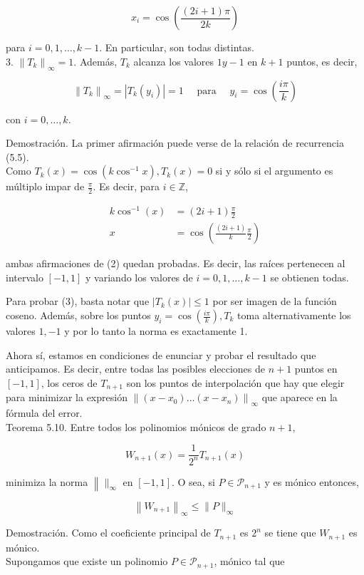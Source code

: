 \documentclass[10pt]{book}
\begin{document}
$$
x_{i}=\cos \left(\frac{(2 i+1) \pi}{2 k}\right)
$$

para $i=0,1, \ldots, k-1$. En particular, son todas distintas.\\
3. $\left\|T_{k}\right\|_{\infty}=1$. Además, $T_{k}$ alcanza los valores $1 y-1$ en $k+1$ puntos, es decir,

$$
\left\|T_{k}\right\|_{\infty}=\left|T_{k}\left(y_{i}\right)\right|=1 \quad \text { para } \quad y_{i}=\cos \left(\frac{i \pi}{k}\right)
$$

con $i=0, \ldots, k$.

Demostración. La primer afirmación puede verse de la relación de recurrencia (5.5).\\
Como $T_{k}(x)=\cos \left(k \cos ^{-1} x\right), T_{k}(x)=0$ si y sólo si el argumento es múltiplo impar de $\frac{\pi}{2}$. Es decir, para $i \in \mathbb{Z}$,

$$
\begin{aligned}
k \cos ^{-1}(x) & =(2 i+1) \frac{\pi}{2} \\
x & =\cos \left(\frac{(2 i+1)}{k} \frac{\pi}{2}\right)
\end{aligned}
$$

ambas afirmaciones de (2) quedan probadas. Es decir, las raíces pertenecen al intervalo $[-1,1]$ y variando los valores de $i=0,1, \ldots, k-1$ se obtienen todas.

Para probar (3), basta notar que $\left|T_{k}(x)\right| \leq 1$ por ser imagen de la función coseno. Además, sobre los puntos $y_{i}=\cos \left(\frac{i \pi}{k}\right), T_{k}$ toma alternativamente los valores $1,-1$ y por lo tanto la norma es exactamente 1.

Ahora sí, estamos en condiciones de enunciar y probar el resultado que anticipamos. Es decir, entre todas las posibles elecciones de $n+1$ puntos en $[-1,1]$, los ceros de $T_{n+1}$ son los puntos de interpolación que hay que elegir para minimizar la expresión $\left\|\left(x-x_{0}\right) \ldots\left(x-x_{n}\right)\right\|_{\infty}$ que aparece en la fórmula del error.\\
Teorema 5.10. Entre todos los polinomios mónicos de grado $n+1$,

$$
W_{n+1}(x)=\frac{1}{2^{n}} T_{n+1}(x)
$$

minimiza la norma $\left\|\|_{\infty}\right.$ en $[-1,1]$. O sea, si $P \in \mathcal{P}_{n+1}$ y es mónico entonces,

$$
\left\|W_{n+1}\right\|_{\infty} \leq\|P\|_{\infty}
$$

Demostración. Como el coeficiente principal de $T_{n+1}$ es $2^{n}$ se tiene que $W_{n+1}$ es mónico.\\
Supongamos que existe un polinomio $P \in \mathcal{P}_{n+1}$, mónico tal que
\end{document}
